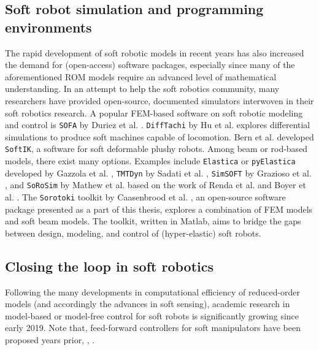 \subsection{Soft robot simulation and programming environments}
The rapid development of soft robotic models in recent years has also increased the demand for (open-access) software packages, especially since many of the aforementioned ROM models require an advanced level of mathematical understanding. In an attempt to help the soft robotics community, many researchers have provided open-source, documented simulators interwoven in their soft robotics research. A popular FEM-based software on soft robotic modeling and control is \texttt{SOFA} by Duriez et al. \cite{Duriez2013,Coevoet2017}. \texttt{DiffTachi} by Hu et al. \cite{Hu2019taichi, Hu2019Oct} explores differential simulations to produce soft machines capable of locomotion. Bern et al. \cite{Bern2022,Bern2019} developed \texttt{SoftIK}, a software for soft deformable plushy robots. Among beam or rod-based models, there exist many options. Examples include \texttt{Elastica} or \texttt{pyElastica} \cite{Tekinalp2022} developed by Gazzola et al. \cite{Gazzola2018,Zhang2019}, \texttt{TMTDyn} by Sadati et al. \cite{Sadati2020}, \texttt{SimSOFT} by Grazioso et al. \cite{Grazioso2019}, and \texttt{SoRoSim} by Mathew et al. \cite{Mathew2021Jul} based on the work of Renda et al. \cite{Renda2020} and Boyer et al. \cite{Boyer2021}. The \texttt{Sorotoki} toolkit by Caasenbrood et al. \cite{SorotokiCode}, an open-source software package presented as a part of this thesis, explores a combination of FEM models and soft beam models. The toolkit, written in Matlab, aims to bridge the gaps between design, modeling, and control of (hyper-elastic) soft robots.
\subsection{Closing the loop in soft robotics}
Following the many developments in computational efficiency of reduced-order models (and accordingly the advances in soft sensing), academic research in model-based or model-free control for soft robots is significantly growing since early 2019. Note that, feed-forward controllers for soft manipulators have been proposed years prior, \eg, \cite{Falkenhahn2015May,Falkenhahn2015,Thuruthel2017Oct,Satheeshbabu2019May}.

